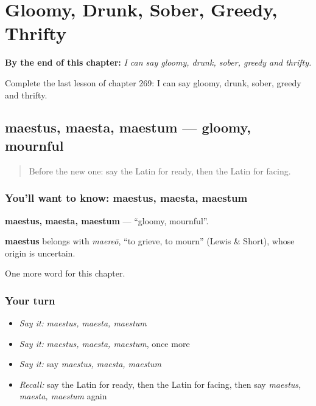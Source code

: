 
\chapter{Gloomy, Drunk, Sober, Greedy, Thrifty}
\label{ch:la-gloomy-drunk-sober-greedy-thrifty}

\begin{chapteropening}
\textbf{By the end of this chapter:} \emph{I can say gloomy, drunk, sober, greedy and thrifty.}

Complete the last lesson of chapter 269: I can say gloomy, drunk, sober, greedy and thrifty.
\end{chapteropening}

\section[maestus, maesta, maestum]{maestus, maesta, maestum — gloomy, mournful}

\label{lesson:LA-C269-maestus}



\begin{quote}
Before the new one: say the Latin for ready, then the Latin for facing.
\end{quote}

\subsection*{You'll want to know: maestus, maesta, maestum}
\textbf{maestus, maesta, maestum} — \textquotedblleft{}gloomy, mournful\textquotedblright{}.

\begin{cousinweb}
\textbf{maestus} belongs with \emph{maereō}, \textquotedblleft{}to grieve, to mourn\textquotedblright{} (Lewis \& Short), whose origin is uncertain.
\end{cousinweb}

\begin{grammarlens}[title={What you've built}]
One more word for this chapter.
\end{grammarlens}

\subsection*{Your turn}
\begin{itemize}
\raggedright
  \item \emph{Say it:} \emph{maestus, maesta, maestum}
  \item \emph{Say it:} \emph{maestus, maesta, maestum}, once more
  \item \emph{Say it:} say \emph{maestus, maesta, maestum}
  \item \emph{Recall:} say the Latin for ready, then the Latin for facing, then say \emph{maestus, maesta, maestum} again
\end{itemize}

